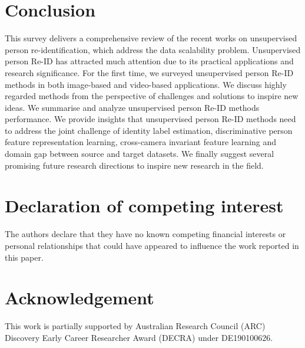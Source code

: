 \documentclass[a4paper,fleqn]{cas-dc}
\begin{document}
\section{Conclusion}\label{conclusion}

This survey delivers a comprehensive review of the recent works on unsupervised person re-identification, which address the data scalability problem. Unsupervised person Re-ID has attracted much attention due to its practical applications and research significance. For the first time, we surveyed unsupervised person Re-ID methods in both image-based and video-based applications. We discuss highly regarded methods from the perspective of challenges and solutions to inspire new ideas. We summarise and analyze unsupervised person Re-ID methods performance. We provide insights that unsupervised person Re-ID methods need to address the joint challenge of identity label estimation, discriminative person feature representation learning, cross-camera invariant feature learning and domain gap between source and target datasets. We finally suggest several promising future research directions to inspire new research in the field.

\printcredits

\section*{Declaration of competing interest}
The authors declare that they have no known competing financial interests or personal relationships that could have appeared to influence the work reported in this paper.

\section*{Acknowledgement}
This work is partially supported by Australian Research Council (ARC) Discovery Early Career Researcher Award (DECRA) under DE190100626.

%





\end{document}
